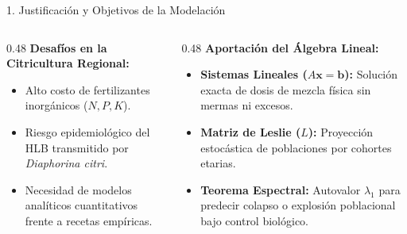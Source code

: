 \documentclass[
  spanish,
  aspectratio=169,
  xcolor={dvipsnames,table}
]{beamer}
\begin{document}
\begin{frame}{1. Justificación y Objetivos de la Modelación}
  \begin{columns}[T]
    \begin{column}{0.48\textwidth}
      \textbf{\color{uanlblue}Desafíos en la Citricultura Regional:}
      \begin{itemize}
        \item Alto costo de fertilizantes inorgánicos ($N, P, K$).
        \item Riesgo epidemiológico del HLB transmitido por \textit{Diaphorina citri}.
        \item Necesidad de modelos analíticos cuantitativos frente a recetas empíricas.
      \end{itemize}
    \end{column}
    \begin{column}{0.48\textwidth}
      \textbf{\color{uanlblue}Aportación del Álgebra Lineal:}
      \begin{itemize}
        \item \textbf{Sistemas Lineales ($A\mathbf{x} = \mathbf{b}$):} Solución exacta de dosis de mezcla física sin mermas ni excesos.
        \item \textbf{Matriz de Leslie ($L$):} Proyección estocástica de poblaciones por cohortes etarias.
        \item \textbf{Teorema Espectral:} Autovalor $\lambda_1$ para predecir colapso o explosión poblacional bajo control biológico.
      \end{itemize}
    \end{column}
  \end{columns}
\end{frame}
\end{document}
